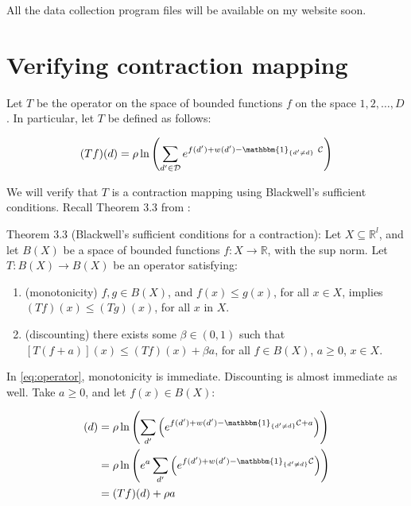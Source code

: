 All the data collection program files will be available on my website soon.

\section{Verifying contraction mapping}
\label{sec:contr_map}

Let $T$ be the operator on the space of bounded functions $f$ on the
space $1,2,\dots,D$. In particular, let $T$ be defined as follows:

\begin{equation}
    (Tf)(d) = \rho \ln\left( \sum_{d' \in \mathcal{D}} e^{f(d') + w(d') - \mathbbm{1}_{\{d'\neq d\}} \ \mathcal{C}} \right)    
    \label{eq:operator}
\end{equation}

We will verify that $T$ is a contraction mapping using Blackwell's
sufficient conditions. Recall Theorem 3.3 from
\citet{stokey1989recursive}:

Theorem 3.3 (Blackwell's sufficient conditions for a contraction): Let
$X \subseteq \mathbb{R}^l$, and let $B(X)$ be a space of bounded
functions $f:X\rightarrow \mathbb{R}$, with the sup norm. Let
$T: B(X) \rightarrow B(X)$ be an operator satisfying:

\begin{enumerate}
\def\labelenumi{\alph{enumi}.}
\itemsep1pt\parskip0pt
\item
  (monotonicity) $f, g \in B(X)$, and $f(x) \leq g(x)$, for all
  $x \in X$, implies $(Tf)(x) \leq (Tg)(x)$, for all $x$ in $X$.
\item
  (discounting) there exists some $\beta \in (0,1)$ such that
  $[T(f + a)](x) \leq (Tf)(x) + \beta a$, for all $f \in B(X) $,
  $a \geq 0$, $x\in X$.
\end{enumerate}

In \eqref{eq:operator}, monotonicity is immediate.  Discounting is almost
immediate as well. Take $a \geq 0$, and let $f(x) \in B(X)$:

\begin{align}
    [T(f + a)](d) &= \rho \ln \left( \sum_{d'} \left(e^{f(d') + w(d') - \mathbbm{1}_{\{d'\neq d\}}\mathcal{C} + a}\right)\right) \nonumber \\
    &= \rho \ln \left( e^a \sum_{d'} \left(e^{f(d') + w(d') - \mathbbm{1}_{\{d'\neq d\}}\mathcal{C}}\right)\right) \nonumber \\
    &= (Tf)(d) + \rho a \nonumber \\
\end{align}

